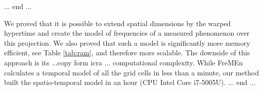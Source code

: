 \begin{table}[]
\caption{Memory Efficiency of Compared Methods}
\label{tab:ram}
\end{table}
... end ... 



We proved that it is possible to extend spatial dimensions by the warped hypertime and create the model of frequencies of a measured phenomenon over this projection.
We also proved that such a model is significantly more memory efficient, see Table \ref{tab:ram},  and therefore more scalable.
The downside of this approach is its ...copy form icra ... computational complexity.
While FreMEn calculates a temporal model of all the grid cells in less than a minute, our method built the spatio-temporal model in an hour (CPU Intel Core i7-5005U).
... end ...

